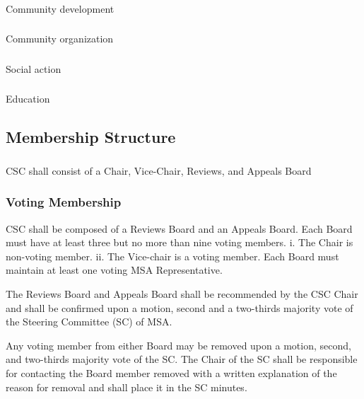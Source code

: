 \subsubsection{}
Community development
\subsubsection{}
Community organization
\subsubsection{}
Social action
\subsubsection{}
Education

\subsection{Membership Structure}
\subsubsection{}
CSC shall consist of a Chair, Vice-Chair, Reviews, and Appeals Board

\subsubsection{Voting Membership}

\subsubsubsection{}
CSC shall be composed of a Reviews Board and an Appeals Board.
\subsubsubsubsection{}
Each Board must have at least three but no more than nine voting members.
\subsubsubsubsubsection{}
i.	The Chair is non-voting member.
\subsubsubsubsubsection{}
ii.	The Vice-chair is a voting member.
\subsubsubsubsection{}
Each Board must maintain at least one voting MSA Representative.

\subsubsubsection{}
The Reviews Board and Appeals Board shall be recommended by the CSC Chair and shall be confirmed upon a motion, second and a two-thirds majority vote of the Steering Committee (SC) of MSA.

\subsubsubsubsection{}
Any voting member from either Board may be removed upon a motion, second, and two-thirds majority vote of the SC.
\subsubsubsubsection{}
The Chair of the SC shall be responsible for contacting the Board member removed with a written explanation of the reason for removal and shall place it in the SC minutes. 

